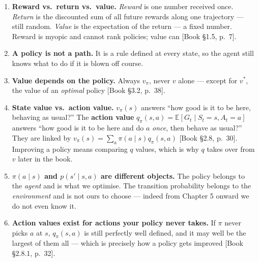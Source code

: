 \documentclass[11pt, letterpaper]{article}
\theoremstyle{runin}
\theoremstyle{runinplain}
\theoremstyle{remark}
\newcommand{\E}{\mathbb{E}}
\newcommand{\bkin}[1]{{\color{bookblue}\small[\textsf{Book #1}]}}
\begin{document}
\begin{enumerate}
  \item \textbf{Reward vs.\ return vs.\ value.} \emph{Reward} is one number received
        once. \emph{Return} is the discounted sum of all future rewards along one
        trajectory --- still random. \emph{Value} is the expectation of the return ---
        a fixed number. Reward is myopic and cannot rank policies; value can
        \bkin{\S1.5, p.~7}.

  \item \textbf{A policy is not a path.} It is a rule defined at every state, so the
        agent still knows what to do if it is blown off course.

  \item \textbf{Value depends on the policy.} Always $v_\pi$, never $v$ alone ---
        except for $v^*$, the value of an \emph{optimal} policy \bkin{\S3.2, p.~38}.

  \item \textbf{State value vs.\ action value.} $v_\pi(s)$ answers ``how good is it to
        be here, behaving as usual?'' The \textbf{action value}
        $q_\pi(s,a)=\E[G_t\mid S_t=s,A_t=a]$ answers ``how good is it to be here and
        do $a$ \emph{once}, then behave as usual?'' They are linked by
        $v_\pi(s)=\sum_a\pi(a\mid s)q_\pi(s,a)$ \bkin{\S2.8, p.~30}. Improving a policy
        means comparing $q$ values, which is why $q$ takes over from $v$ later in the
        book.

  \item \textbf{$\pi(a\mid s)$ and $p(s'\mid s,a)$ are different objects.} The policy
        belongs to the \emph{agent} and is what we optimise. The transition
        probability belongs to the \emph{environment} and is not ours to choose ---
        indeed from Chapter 5 onward we do not even know it.

  \item \textbf{Action values exist for actions your policy never takes.} If $\pi$
        never picks $a$ at $s$, $q_\pi(s,a)$ is still perfectly well defined, and it
        may well be the largest of them all --- which is precisely how a policy gets
        improved \bkin{\S2.8.1, p.~32}.
\end{enumerate}
\end{document}
